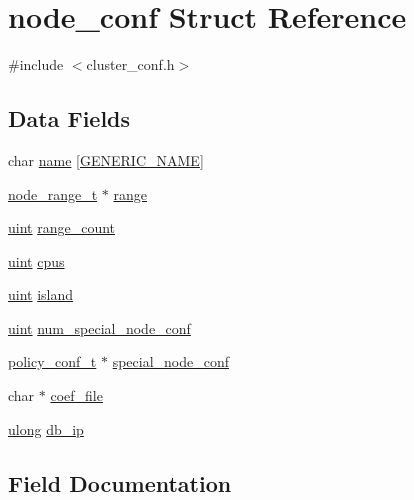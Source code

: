 \hypertarget{structnode__conf}{}\section{node\+\_\+conf Struct Reference}
\label{structnode__conf}


{\ttfamily \#include $<$cluster\+\_\+conf.\+h$>$}

\subsection*{Data Fields}
\begin{DoxyCompactItemize}
\item 
char \hyperlink{structnode__conf_af7a1d41dae2d2eb9788efb97974ba3d5}{name} \mbox{[}\hyperlink{loop_8h_a6b0b8b14cfc75447be8feba3efe18da8}{G\+E\+N\+E\+R\+I\+C\+\_\+\+N\+A\+ME}\mbox{]}
\item 
\hyperlink{cluster__conf_8h_a1a626af99799b910746d0c23516856ff}{node\+\_\+range\+\_\+t} $\ast$ \hyperlink{structnode__conf_a5394f43cda2a680737d64fe562d4d440}{range}
\item 
\hyperlink{generic_8h_a91ad9478d81a7aaf2593e8d9c3d06a14}{uint} \hyperlink{structnode__conf_a80ef5a0787f5753bd1503edf8c40b853}{range\+\_\+count}
\item 
\hyperlink{generic_8h_a91ad9478d81a7aaf2593e8d9c3d06a14}{uint} \hyperlink{structnode__conf_af59daa367ed9d4389f86d37cf9bbe210}{cpus}
\item 
\hyperlink{generic_8h_a91ad9478d81a7aaf2593e8d9c3d06a14}{uint} \hyperlink{structnode__conf_ab6cfb5577496d8b6d28734123cf9a9e1}{island}
\item 
\hyperlink{generic_8h_a91ad9478d81a7aaf2593e8d9c3d06a14}{uint} \hyperlink{structnode__conf_a9becaf4872ace6b670b60d308aa48364}{num\+\_\+special\+\_\+node\+\_\+conf}
\item 
\hyperlink{cluster__conf_8h_adb213a7b2565c7dc2cc3c9305f0cbc8d}{policy\+\_\+conf\+\_\+t} $\ast$ \hyperlink{structnode__conf_ac4f955d9d7981a220b1827f9301c952f}{special\+\_\+node\+\_\+conf}
\item 
char $\ast$ \hyperlink{structnode__conf_ad9723183ea63ac722e796964b038ce07}{coef\+\_\+file}
\item 
\hyperlink{generic_8h_a718b4eb2652c286f4d42dc18a8e71a1a}{ulong} \hyperlink{structnode__conf_a02ff62f2f367c209defd3a9a73ca2b9a}{db\+\_\+ip}
\end{DoxyCompactItemize}


\subsection{Field Documentation}
